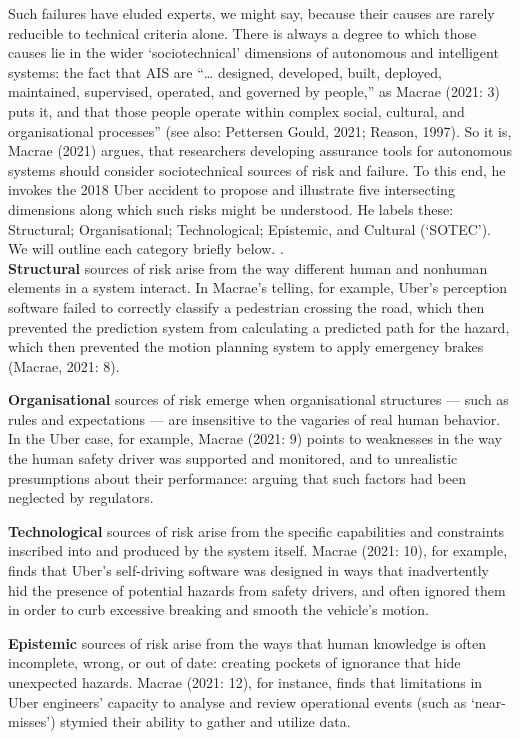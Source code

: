 \documentclass[lettersize,journal]{IEEEtran}
\begin{document}
Such failures have eluded experts, we might say, because their causes are rarely reducible to technical criteria alone. There is always a degree to which those causes lie in the wider ‘sociotechnical’ dimensions of autonomous and intelligent systems: the fact that AIS are “… designed, developed, built, deployed, maintained, supervised, operated, and governed by people,” as Macrae (2021: 3) puts it, and that those people operate within complex social, cultural, and organisational processes” (see also: Pettersen Gould, 2021; Reason, 1997). So it is, Macrae (2021) argues, that researchers developing assurance tools for autonomous systems should consider sociotechnical sources of risk and failure. To this end, he invokes the 2018 Uber accident to propose and illustrate five intersecting dimensions along which such risks might be understood. He labels these: Structural; Organisational; Technological; Epistemic, and Cultural (‘SOTEC’). We will outline each category briefly below.
. \\

\textbf{Structural} sources of risk arise from the way different human and nonhuman elements in a system interact. In Macrae’s telling, for example, Uber’s perception software failed to correctly classify a pedestrian crossing the road, which then prevented the prediction system from calculating a predicted path for the hazard, which then prevented the motion planning system to apply emergency brakes (Macrae, 2021: 8). 

\textbf{Organisational} sources of risk emerge when organisational structures — such as rules and expectations — are insensitive to the vagaries of real human behavior. In the Uber case, for example, Macrae (2021: 9) points to weaknesses in the way the human safety driver was supported and monitored, and to unrealistic presumptions about their performance: arguing that such factors had been neglected by regulators. 

\textbf{Technological} sources of risk arise from the specific capabilities and constraints inscribed into and produced by the system itself. Macrae (2021: 10), for example, finds that Uber’s self-driving software was designed in ways that inadvertently hid the presence of potential hazards from safety drivers, and often ignored them in order to curb excessive breaking and smooth the vehicle’s motion. 

\textbf{Epistemic} sources of risk arise from the ways that human knowledge is often incomplete, wrong, or out of date: creating pockets of ignorance that hide unexpected hazards. Macrae (2021: 12), for instance, finds that limitations in Uber engineers’ capacity to analyse and review operational events (such as ‘near-misses’) stymied their ability to gather and utilize data. 
\end{document}
